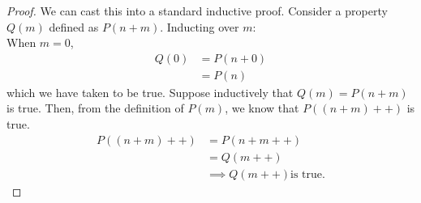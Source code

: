 \documentclass[11pt]{report}
\begin{document}
\begin{proof}
	We can cast this into a standard inductive proof.
	Consider a property $Q(m)$ defined as $P(n + m)$. Inducting over $m$: \\
	When $m = 0$,
	\begin{align*}
		Q(0) & =	P(n + 0) \\
		     & =	P(n)
	\end{align*}
	which we have taken to be true.
	Suppose inductively that $Q(m) = P(n + m)$ is true. Then, from the definition of $P(m)$, we know that $P((n + m)++)$ is true.
	\begin{align*}
		P((n + m)++) & =	P(n + m++)                    \\
		             & =	Q(m++)                        \\
		             & \implies Q(m++) \text{is true.}
	\end{align*}
\end{proof}
\end{document}

